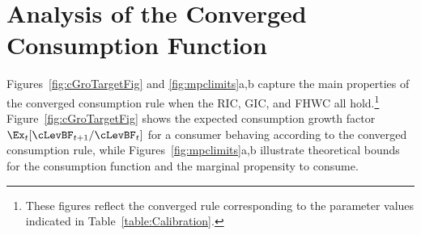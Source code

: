 \documentclass[titlepage]{\econtex}\providecommand{\texname}{BufferStockTheory}%
\begin{document}
{\begin{comment}
The precautionary motive induced by the noncapital income risk can be
thought of as being like a smoothed version of liquidity constraints.
As cash declines toward zero, the size of the risk relative to the
size of cash increases, which means that the relative variation in
consumption increases, which means that the intensity of the
precautionary motive increases.  For a more rigorous and detailed
treatment of the relationship between precautionary saving and
liquidity constraints, see Carroll and
Kimball~\citeyearpar{carroll&kimball:liquidity}.
\end{comment}

\hypertarget{AnalysisoftheConvergedConsumptionFunction}{}
\section{Analysis of the Converged Consumption Function}

Figures~\ref{fig:cGroTargetFig} and \ref{fig:mpclimits}a,b capture the
main properties of the converged consumption rule when the RIC, GIC,
and FHWC all hold.\footnote{These figures reflect the converged rule
  corresponding to the parameter values indicated in
  Table~\ref{table:Calibration}.}  Figure~\ref{fig:cGroTargetFig}
shows the expected consumption growth factor
$\Ex_{t}[\cLevBF_{t+1}/\cLevBF_{t}]$ for a consumer behaving according to
the converged consumption rule, while Figures~\ref{fig:mpclimits}a,b
illustrate theoretical bounds for the consumption function and the
marginal propensity to consume.

}
\end{document}
